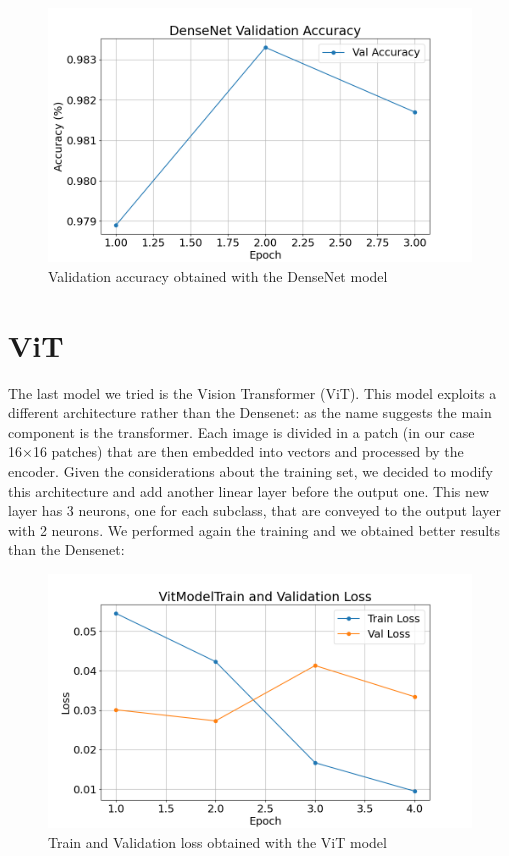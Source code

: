 \documentclass[11pt,journal]{IEEEtran}
\begin{document}
\begin{figure}[ht]
	\renewcommand{\arraystretch}{2.0}
	\label{DenseNet_Val_Accuracy}
	\centering
	\includegraphics[width=\linewidth]{DenseNet_Val_Accuracy}
	\caption{Validation accuracy obtained with the DenseNet model}
\end{figure}
\section{ViT}
The last model we tried is the Vision Transformer (ViT)\cite{ViT}. This model exploits a different architecture rather than the Densenet: as the name suggests the main component is the transformer. Each image is divided in a patch (in our case 16×16 patches) that are then embedded into vectors and processed by the encoder.
Given the considerations about the training set, we decided to modify this architecture and add another linear layer before the output one. This new layer has 3 neurons, one for each subclass, that are conveyed to the output layer with 2 neurons.
We performed again the training and we obtained better results than the Densenet:
\begin{figure}[ht]
	\renewcommand{\arraystretch}{2.0}
	\label{VitModel_TrainVal_Loss}
	\centering
	\includegraphics[width=\linewidth]{VitModel_TrainVal_Loss}
	\caption{Train and Validation loss obtained with the ViT model}
\end{figure}
\end{document}
